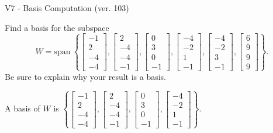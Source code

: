 \begin{exercise}
  \begin{exerciseTitle}V7 - Basis Computation (ver. 103)\end{exerciseTitle}
  \begin{exerciseStatement}
    Find a basis for the subspace 
\[W=\mathrm{span}\ \left\{\left[\begin{array}{r}
-1 \\
2 \\
-4 \\
-4
\end{array}\right] , \left[\begin{array}{r}
2 \\
-4 \\
-4 \\
-1
\end{array}\right] , \left[\begin{array}{r}
0 \\
3 \\
0 \\
-1
\end{array}\right] , \left[\begin{array}{r}
-4 \\
-2 \\
1 \\
-1
\end{array}\right] , \left[\begin{array}{r}
-4 \\
-2 \\
3 \\
-1
\end{array}\right] , \left[\begin{array}{r}
6 \\
9 \\
9 \\
9
\end{array}\right]\right\}.\]
 Be sure to explain why your result is a basis.


  \end{exerciseStatement}
  \begin{exerciseAnswer}
   A basis of \(W\) is  \(\left\{\left[\begin{array}{r}
-1 \\
2 \\
-4 \\
-4
\end{array}\right] , \left[\begin{array}{r}
2 \\
-4 \\
-4 \\
-1
\end{array}\right] , \left[\begin{array}{r}
0 \\
3 \\
0 \\
-1
\end{array}\right] , \left[\begin{array}{r}
-4 \\
-2 \\
1 \\
-1
\end{array}\right]\right\}\).
  


  \end{exerciseAnswer}
\end{exercise}
